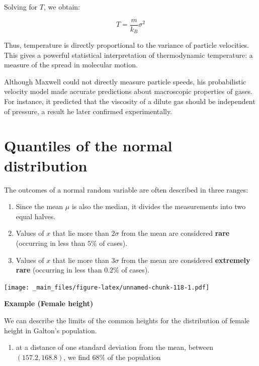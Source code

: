 \documentclass[
]{book}
\providecommand{\tightlist}{%
  \setlength{\itemsep}{0pt}\setlength{\parskip}{0pt}}
\begin{document}
Solving for \(T\), we obtain:

\[
T = \frac{m}{k_B} \sigma^2
\]

Thus, temperature is directly proportional to the variance of particle velocities. This gives a powerful statistical interpretation of thermodynamic temperature: a measure of the spread in molecular motion.

Although Maxwell could not directly measure particle speeds, his probabilistic velocity model made accurate predictions about macroscopic properties of gases. For instance, it predicted that the viscosity of a dilute gas should be independent of pressure, a result he later confirmed experimentally.

\hypertarget{quantiles-of-the-normal-distribution}{%
\section{Quantiles of the normal distribution}\label{quantiles-of-the-normal-distribution}}

The outcomes of a normal random variable are often described in three ranges:

\begin{enumerate}
\def\labelenumi{\arabic{enumi}.}
\item
  Since the mean \(\mu\) is also the median, it divides the measurements into two equal halves.
\item
  Values of \(x\) that lie more than \(2\sigma\) from the mean are considered \textbf{rare} (occurring in less than \(5\%\) of cases).
\item
  Values of \(x\) that lie more than \(3\sigma\) from the mean are considered \textbf{extremely rare} (occurring in less than \(0.2\%\) of cases).
\end{enumerate}

\texttt{[image: \_main\_files/figure-latex/unnamed-chunk-118-1.pdf]}

\textbf{Example (Female height)}

We can describe the limits of the common heights for the distribution of female height in Galton's population.

\begin{enumerate}
\def\labelenumi{\arabic{enumi})}
\tightlist
\item
  at a distance of one standard deviation from the mean, between \((157.2, 168.8)\), we find \(68\%\) of the population
\end{enumerate}
\end{document}
